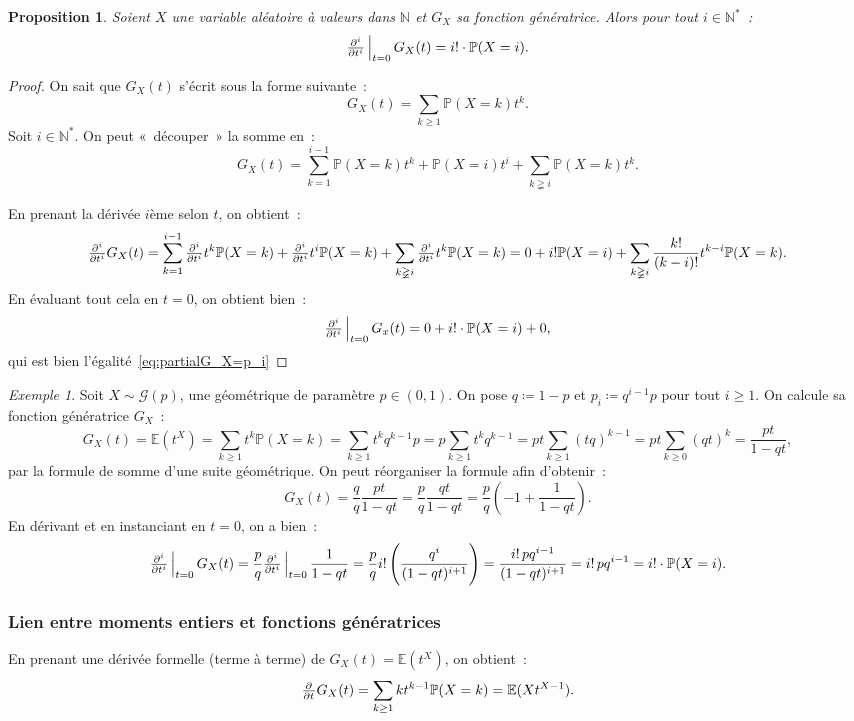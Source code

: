 \documentclass{article}
\newcommand{\E}{\mathbb E}
\newcommand{\N}{\mathbb N}
\renewcommand{\P}{\mathbb P}
\newcommand{\evipd}[3][i]{\pd[i] {}{#2}\sVert[2]_{#2=#3}}  %
\newtheorem{prp}[thm]{Proposition}
\theoremstyle{definition}
\theoremstyle{remark}
\newtheorem{ex}{Exemple}
\begin{document}
		\begin{prp} Soient $X$ une variable aléatoire à valeurs dans $\N$ et $G_X$ sa fonction génératrice. Alors pour tout $i \in \N^*$~:
		\begin{equation}\label{eq:partialG_X=p_i}
			\evipd t0G_X(t) = i! \cdot \P(X = i).
		\end{equation}
		\end{prp}

		\begin{proof} On sait que $G_X(t)$ s'écrit sous la forme suivante~:
		\[G_X(t) = \sum_{k \geq 1}\P(X = k)t^k.\]
		Soit $i \in \N^*$. On peut «~découper~» la somme en~:
		\[G_X(t) = \sum_{k=1}^{i-1}\P(X = k)t^k + \P(X=i)t^i + \sum_{k \gneqq i}\P(X = k)t^k.\]

		En prenant la dérivée $i$ème selon $t$, on obtient~:
		\[\pd[i] {}tG_X(t) = \sum_{k=1}^{i-1}\pd[i] {}tt^k\P(X=k) + \pd[i] {}tt^i\P(X=k) + \sum_{k \gneqq i}\pd[i] {}tt^k\P(X=k)
		= 0 + i!\P(X=i) + \sum_{k \gneqq i}\frac {k!}{(k-i)!}t^{k-i}\P(X=k).\]
		En évaluant tout cela en $t=0$, on obtient bien~:
		\[\evipd t0G_x(t) = 0 + i! \cdot \P(X = i) + 0,\]
		qui est bien l'égalité~\eqref{eq:partialG_X=p_i}
		\end{proof}

		\begin{ex} Soit $X \sim \mathcal G(p)$, une géométrique de paramètre $p \in (0, 1)$. On pose $q \coloneqq 1-p$ et $p_i \coloneqq q^{i-1}p$ pour tout
		$i \geq 1$. On calcule sa fonction génératrice $G_X$~:
		\[G_X(t) = \E(t^X) = \sum_{k \geq 1}t^k\P(X=k) = \sum_{k \geq 1}t^kq^{k-1}p = p\sum_{k \geq 1}t^kq^{k-1} = pt \sum_{k \geq 1}(tq)^{k-1} = pt \sum_{k \geq 0}(qt)^k
		= \frac {pt}{1-qt},\]
		par la formule de somme d'une suite géométrique.
		On peut réorganiser la formule afin d'obtenir~:
		\[G_X(t) = \frac qq\frac {pt}{1-qt} = \frac pq\frac {qt}{1-qt} = \frac pq\left(-1 + \frac 1{1-qt}\right).\]
		En dérivant et en instanciant en $t=0$, on a bien~:
		\[\evipd t0G_X(t) = \frac pq\evipd t0\frac {1}{1-qt} = \frac pqi!\left(\frac {q^i}{(1-qt)^{i+1}}\right) = \frac {i!\,pq^{i-1}}{(1-qt)^{i+1}} = i!\,pq^{i-1}
		= i! \cdot \P(X = i).\]
		\end{ex}

		\subsubsection{Lien entre moments entiers et fonctions génératrices}
		En prenant une dérivée formelle (terme à terme) de $G_X(t) = \E(t^X)$, on obtient~:
		\[\pd {}tG_X(t) = \sum_{k \geq 1}kt^{k-1}\P(X=k) = \E(Xt^{X-1}).\]
\end{document}
